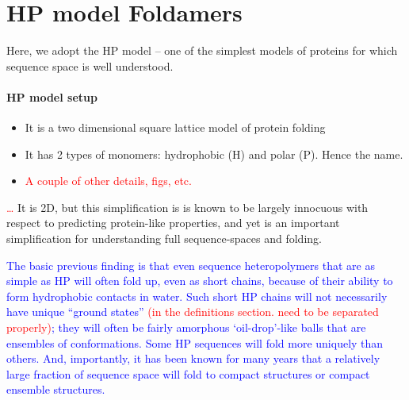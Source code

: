 \documentclass[12pt]{paper}
\newcommand{\red}[1]{\textcolor{red}{#1}}
\newcommand{\blue}[1]{\textcolor{blue}{#1}}
\begin{document}
 





\section{HP model Foldamers}
Here, we adopt the HP model -- one of the simplest models of proteins for which sequence 
space is well understood.   
\paragraph{HP model setup} 
\begin{itemize}
 \item It is a two dimensional square lattice model of protein folding
 \item It has 2 types of monomers: hydrophobic (H) and polar (P). Hence the name.
 \item \red{A couple of other details, figs, etc.}
\end{itemize}
\red{\dots}  It is 2D, but this simplification is  is known to be largely innocuous 
with respect to predicting protein-like properties, and yet is an important simplification for 
understanding full sequence-spaces and folding.   

\blue{The basic previous finding is that even sequence heteropolymers that are as simple as HP 
will often fold up, even as short chains, because of their ability to form hydrophobic contacts in 
water.  Such short HP chains will not necessarily have unique ``ground states'' \red{(in the 
definitions section. need to be separated properly)}; they will often be fairly amorphous 
`oil-drop’-like balls that are ensembles of conformations.  Some HP sequences will fold more 
uniquely than others.  And, importantly, it has been known for many years \cite{lau1989lattice} 
that a relatively large fraction of sequence space will fold to compact structures or compact 
ensemble structures.}
\end{document}
